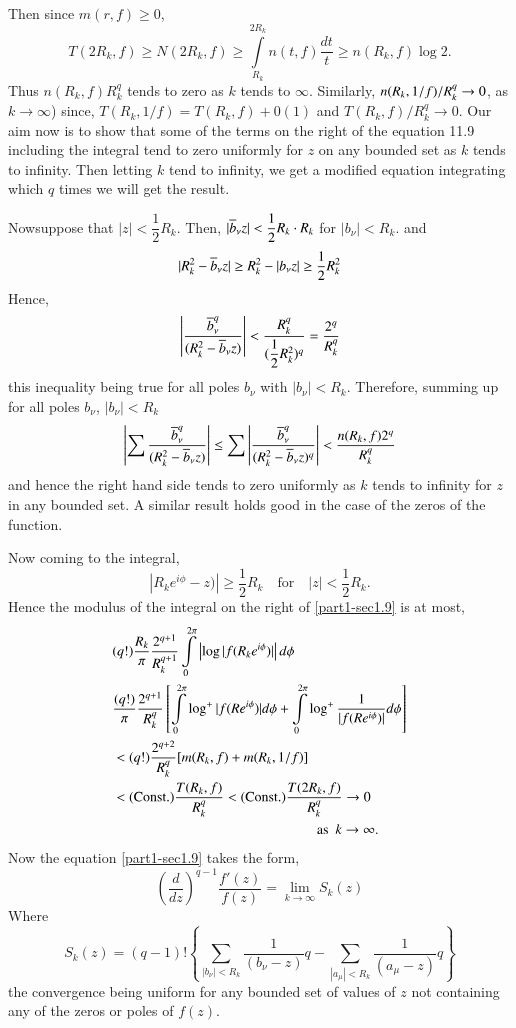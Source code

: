 Then since $m(r,f)\geq 0$,
$$
T(2R_{k},f)\geq N(2R_{k},f)\geq
\int\limits^{2R_{k}}_{R_{k}}n(t,f)\frac{dt}{t}\geq n(R_{k},f)\log 2.
$$
Thus $n(R_{k},f)R^{q}_{k}$ tends to zero as $k$ tends to
$\infty$. Similarly, $n(R_{k},1/f)/R_{k}^{q}\unskip\break\to 0$, as $k\to \infty$)
since, $T(R_{k},1/f)=T(R_{k},f)+0(1)$ and $T(R_{k},f)/R_{k}^{q}\to
0$. Our aim now is to show that some of the terms on the right of the
equation 11.9 including the integral tend to zero uniformly for $z$ on
any bounded set as $k$ tends to infinity. Then letting $k$ tend to
infinity, we get a modified equation integrating which $q$ times we
will get the result.

Now\pageoriginale suppose that $|z|<\dfrac{1}{2}R_{k}$. Then,
$|\overline{b}_{\nu}z|<\dfrac{1}{2}R_{k}\cdot R_{k}$ for
$|b_{\nu}|<R_{k}$. and
$$
|R^{2}_{k}-\overline{b}_{\nu}z|\geq R^{2}_{k}-|b_{\nu}z|\geq
\dfrac{1}{2}R^{2}_{k}
$$
Hence,
$$
\left|\frac{\overline{b}^{q}_{\nu}}{(R^{2}_{k}-\overline{b}_{\nu}z)}\right|<\frac{R^{q}_{k}}{(\dfrac{1}{2}R^{2}_{k})^{q}}=\frac{2^{q}}{R^{q}_{k}}
$$
this inequality being true for all poles $b_{\nu}$ with
$|b_{\nu}|<R_{k}$. Therefore, summing up for all poles $b_{\nu}$,
$|b_{\nu}|<R_{k}$ 
$$
\left|\sum
\frac{\overline{b}^{q}_{\nu}}{(R^{2}_{k}-\overline{b}_{\nu}z)}\right|\leq
\sum\left|\frac{\overline{b}^{q}_{\nu}}{(R^{2}_{k}-\overline{b}_{\nu}z)^{q}}\right|<\frac{n(R_{k},f)2^{q}}{R^{q}_{k}} 
$$
and hence the right hand side tends to zero uniformly as $k$ tends to
infinity for $z$ in any bounded set. A similar result holds good in
the case of the zeros of the function.

Now coming to the integral,
$$
|R_{k}e^{i\phi}-z)|\geq \frac{1}{2}R_{k}\quad\text{for}\quad
|z|<\frac{1}{2}R_{k}.
$$
Hence the modulus of the integral on the right of \eqref{part1-sec1.9} is
at most,
\begin{align*}
& (q!)\frac{R_{k}}{\pi}\frac{2^{q+1}}{R^{q+1}_{k}}\int\limits^{2\pi}_{0}\left|\log
  |f(R_{k}e^{i\phi})|\right|d\phi\\
&\frac{(q!)}{\pi}\frac{2^{q+1}}{R^{q}_{k}}\left[\int\limits^{2\pi}_{0}\log^{+}|f(Re^{i\phi})|d\phi+\int\limits^{2\pi}_{0}\log^{+}\frac{1}{|f(Re^{i\phi})|}d\phi\right]\\
&< (q!)\frac{2^{q+2}}{R^{q}_{k}}[m(R_{k},f)+m(R_{k},1/f)]\\
&< (\text{Const.)}
  \frac{T(R_{k},f)}{R^{q}_{k}}<(\text{Const.})\frac{T(2R_{k},f)}{R^{q}_{k}}\to
  0\\
&\hspace{5.15cm} \text{as \ } k\to \infty.
\end{align*}\pageoriginale
Now the equation \eqref{part1-sec1.9} takes the form,
$$
\left(\frac{d}{dz}\right)^{q-1}\frac{f'(z)}{f(z)}=\lim\limits_{k\to\infty}S_{k}(z)
$$
Where
$$
S_{k}(z)=(q-1)!\left\{\sum_{|b_{\nu}|<R_{k}}\frac{1}{(b_{\nu}-z)}q-\sum_{|a_{\mu}|<R_{k}}\frac{1}{(a_{\mu}-z)}q\right\} 
$$
the convergence being uniform for any bounded set of values of $z$ not
containing any of the zeros or poles of $f(z)$.

